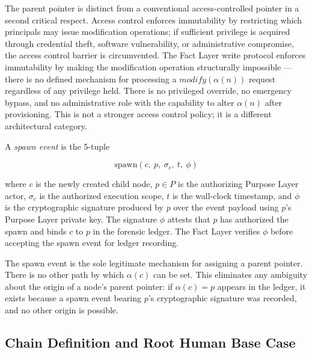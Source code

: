 The parent pointer is distinct from a conventional access-controlled pointer in a second critical respect. Access control enforces immutability by restricting which principals may issue modification operations; if sufficient privilege is acquired through credential theft, software vulnerability, or administrative compromise, the access control barrier is circumvented. The Fact Layer write protocol enforces immutability by making the modification operation structurally impossible — there is no defined mechanism for processing a $\textit{modify}(\alpha(n))$ request regardless of any privilege held. There is no privileged override, no emergency bypass, and no administrative role with the capability to alter $\alpha(n)$ after provisioning. This is not a stronger access control policy; it is a different architectural category.

\begin{dfn}
\label{dfn:spawn-event}
A \emph{spawn event} is the 5-tuple

\begin{equation}
\mathrm{spawn}(c,\ p,\ \sigma_c,\ t,\ \phi)
\label{eq:spawn-event}
\end{equation}

where $c$ is the newly created child node, $p \in P$ is the authorizing Purpose Layer actor, $\sigma_c$ is the authorized execution scope, $t$ is the wall-clock timestamp, and $\phi$ is the cryptographic signature produced by $p$ over the event payload using $p$'s Purpose Layer private key. The signature $\phi$ attests that $p$ has authorized the spawn and binds $c$ to $p$ in the forensic ledger. The Fact Layer verifies $\phi$ before accepting the spawn event for ledger recording.
\end{dfn}

The spawn event is the sole legitimate mechanism for assigning a parent pointer. There is no other path by which $\alpha(c)$ can be set. This eliminates any ambiguity about the origin of a node's parent pointer: if $\alpha(c) = p$ appears in the ledger, it exists because a spawn event bearing $p$'s cryptographic signature was recorded, and no other origin is possible.

\subsection{Chain Definition and Root Human Base Case}
\label{sec:chain-definition}

